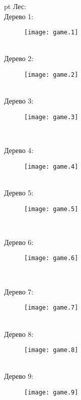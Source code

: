 \documentclass[pdftex,12pt,a4paper]{article}
\begin{document}
 pt %
Лес: \\

Дерево 1: \\
\begin{figure}[htbp]
    \texttt{[image: game.1]}
\end{figure} \\

Дерево 2: \\
\begin{figure}[htbp]
    \texttt{[image: game.2]}
\end{figure} \\

Дерево 3: \\
\begin{figure}[htbp]
    \texttt{[image: game.3]}
\end{figure}\\

\newpage

Дерево 4: \\
\begin{figure}[htbp]
    \texttt{[image: game.4]}
\end{figure}\\

Дерево 5: \\
\begin{figure}[htbp]
    \texttt{[image: game.5]}
\end{figure}\\

\newpage

Дерево 6: \\
\begin{figure}[htbp]
    \texttt{[image: game.6]}
\end{figure}\\

\newpage

Дерево 7: \\
\begin{figure}[htbp]
    \texttt{[image: game.7]}
\end{figure}\\

Дерево 8: \\
\begin{figure}[htbp]
    \texttt{[image: game.8]}
\end{figure}\\

Дерево 9: \\
\begin{figure}[htbp]
    \texttt{[image: game.9]}
\end{figure}\\
\end{document}

